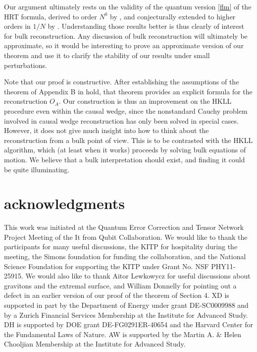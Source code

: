 \documentclass[aps,nofootinbib,longbibliography,superscriptaddress,12pt]{revtex4-1}
\begin{document}
Our argument ultimately rests on the validity of the quantum version \eqref{flm} of the HRT formula, derived to order $N^0$ by \cite{Faulkner:2013ana}, and conjecturally extended to higher orders in $1/N$ by \cite{Engelhardt:2014gca}.  Understanding those results better is thus clearly of interest for bulk reconstruction.  Any discussion of bulk reconstruction will ultimately be approximate, so it would be interesting to prove an approximate version of our theorem and use it to clarify the stability of our results under small perturbations.

Note that our proof is constructive.  After establishing the assumptions of the theorem of Appendix B in \cite{Almheiri:2014lwa} hold, that theorem provides an explicit formula for the reconstruction $O_A$.  Our construction is thus an improvement on the HKLL procedure even within the causal wedge, since the nonstandard Cauchy problem involved in causal wedge reconstruction has only been solved in special cases.  However, it does not give much insight into how to think about the reconstruction from a bulk point of view.  This is to be contrasted with the HKLL algorithm, which (at least when it works) proceeds by solving bulk equations of motion.  We believe that a bulk interpretation should exist, and finding it could be quite illuminating.

\section*{acknowledgments}
{\small This work was initiated at the Quantum Error Correction and Tensor Network Project Meeting of the It from Qubit Collaboration.  We would like to thank the participants for many useful discussions, the KITP for hospitality during the meeting, the Simons foundation for funding the collaboration, and the National Science Foundation for supporting the KITP under Grant No. NSF PHY11-25915.  We would also like to thank Aitor Lewkowycz for useful discussions about gravitons and the extremal surface, and William Donnelly for pointing out a defect in an earlier version of our proof of the theorem of Section 4.  XD is supported in part by the Department of Energy under grant DE-SC0009988 and by a Zurich Financial Services Membership at the Institute for Advanced Study.  DH is supported by DOE grant  DE-FG0291ER-40654 and the Harvard Center for the Fundamental Laws of Nature. AW is supported by the Martin A. \& Helen Chooljian Membership at the Institute for Advanced Study.}

\appendix\label{proof}
\end{document}
